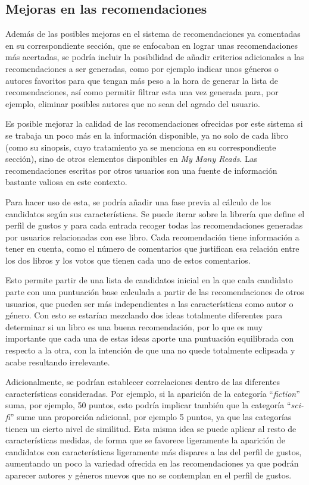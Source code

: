 \subsection{Mejoras en las recomendaciones}
\label{mejoras en las recomendaciones}

Además de las posibles mejoras en el sistema de recomendaciones ya comentadas en su correspondiente sección, que se enfocaban en lograr unas recomendaciones más acertadas, se podría incluir la posibilidad de añadir criterios adicionales a las recomendaciones a ser generadas, como por ejemplo indicar unos géneros o autores favoritos para que tengan más peso a la hora de generar la lista de recomendaciones, así como permitir filtrar esta una vez generada para, por ejemplo, eliminar posibles autores que no sean del agrado del usuario.

Es posible mejorar la calidad de las recomendaciones ofrecidas por este sistema si se trabaja un poco más en la información disponible, ya no solo de cada libro (como su sinopsis, cuyo tratamiento ya se menciona en su correspondiente sección), sino de otros elementos disponibles en \textit{My Many Reads}. Las recomendaciones escritas por otros usuarios son una fuente de información bastante valiosa en este contexto.

Para hacer uso de esta, se podría añadir una fase previa al cálculo de los candidatos según sus características. Se puede iterar sobre la librería que define el perfil de gustos y para cada entrada recoger todas las recomendaciones generadas por usuarios relacionadas con ese libro. Cada recomendación tiene información a tener en cuenta, como el número de comentarios que justifican esa relación entre los dos libros y los votos que tienen cada uno de estos comentarios.

Esto permite partir de una lista de candidatos inicial en la que cada candidato parte con una puntuación base calculada a partir de las recomendaciones de otros usuarios, que pueden ser más independientes a las características como autor o género. Con esto se estarían mezclando dos ideas totalmente diferentes para determinar si un libro es una buena recomendación, por lo que es muy importante que cada una de estas ideas aporte una puntuación equilibrada con respecto a la otra, con la intención de que una no quede totalmente eclipsada y acabe resultando irrelevante.

Adicionalmente, se podrían establecer correlaciones dentro de las diferentes características consideradas. Por ejemplo, si la aparición de la categoría ``\textit{fiction}'' suma, por ejemplo, 50 puntos, esto podría implicar también que la categoría ``\textit{sci-fi}'' sume una proporción adicional, por ejemplo 5 puntos, ya que las categorías tienen un cierto nivel de similitud. Esta misma idea se puede aplicar al resto de características medidas, de forma que se favorece ligeramente la aparición de candidatos con características ligeramente más dispares a las del perfil de gustos, aumentando un poco la variedad ofrecida en las recomendaciones ya que podrán aparecer autores y géneros nuevos que no se contemplan en el perfil de gustos.


